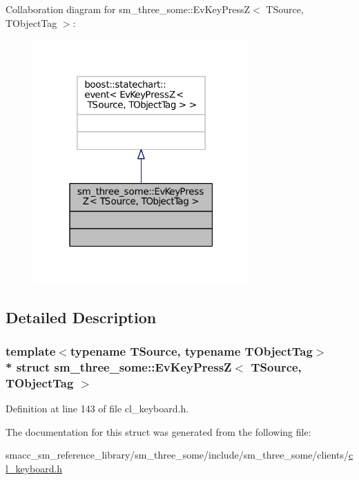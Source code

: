 Collaboration diagram for sm\+\_\+three\+\_\+some\+:\+:Ev\+Key\+PressZ$<$ T\+Source, T\+Object\+Tag $>$\+:
\nopagebreak
\begin{figure}[H]
\begin{center}
\leavevmode
\includegraphics[width=235pt]{structsm__three__some_1_1EvKeyPressZ__coll__graph}
\end{center}
\end{figure}


\subsection{Detailed Description}
\subsubsection*{template$<$typename T\+Source, typename T\+Object\+Tag$>$\\*
struct sm\+\_\+three\+\_\+some\+::\+Ev\+Key\+Press\+Z$<$ T\+Source, T\+Object\+Tag $>$}



Definition at line 143 of file cl\+\_\+keyboard.\+h.



The documentation for this struct was generated from the following file\+:\begin{DoxyCompactItemize}
\item 
smacc\+\_\+sm\+\_\+reference\+\_\+library/sm\+\_\+three\+\_\+some/include/sm\+\_\+three\+\_\+some/clients/\hyperlink{cl__keyboard_8h}{cl\+\_\+keyboard.\+h}\end{DoxyCompactItemize}
